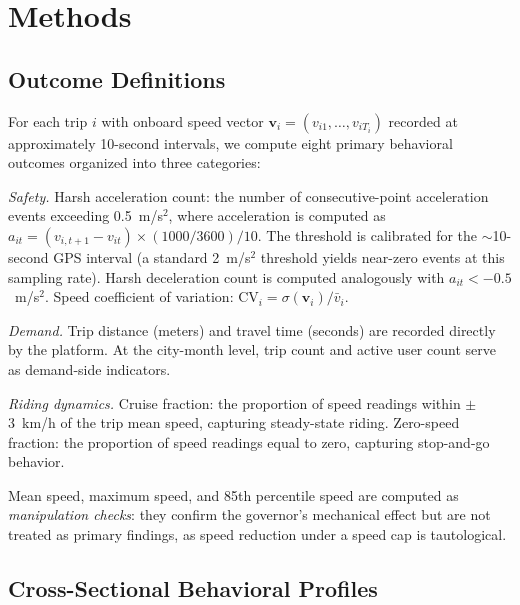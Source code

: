 \section{Methods}
\label{sec:methodology}

\subsection{Outcome Definitions}
\label{sec:meth_outcomes}

For each trip $i$ with onboard speed vector $\mathbf{v}_i = (v_{i1}, \ldots, v_{iT_i})$ recorded at approximately 10-second intervals, we compute eight primary behavioral outcomes organized into three categories:

\textit{Safety.} Harsh acceleration count: the number of consecutive-point acceleration events exceeding 0.5~m/s$^2$, where acceleration is computed as $a_{it} = (v_{i,t+1} - v_{it}) \times (1000/3600) / 10$. The threshold is calibrated for the $\sim$10-second GPS interval (a standard 2~m/s$^2$ threshold yields near-zero events at this sampling rate). Harsh deceleration count is computed analogously with $a_{it} < -0.5$~m/s$^2$. Speed coefficient of variation: $\text{CV}_i = \sigma(\mathbf{v}_i) / \bar{v}_i$.

\textit{Demand.} Trip distance (meters) and travel time (seconds) are recorded directly by the platform. At the city-month level, trip count and active user count serve as demand-side indicators.

\textit{Riding dynamics.} Cruise fraction: the proportion of speed readings within $\pm$3~km/h of the trip mean speed, capturing steady-state riding. Zero-speed fraction: the proportion of speed readings equal to zero, capturing stop-and-go behavior.

Mean speed, maximum speed, and 85th percentile speed are computed as \textit{manipulation checks}: they confirm the governor's mechanical effect but are not treated as primary findings, as speed reduction under a speed cap is tautological.

\subsection{Cross-Sectional Behavioral Profiles}
\label{sec:meth_gee}

